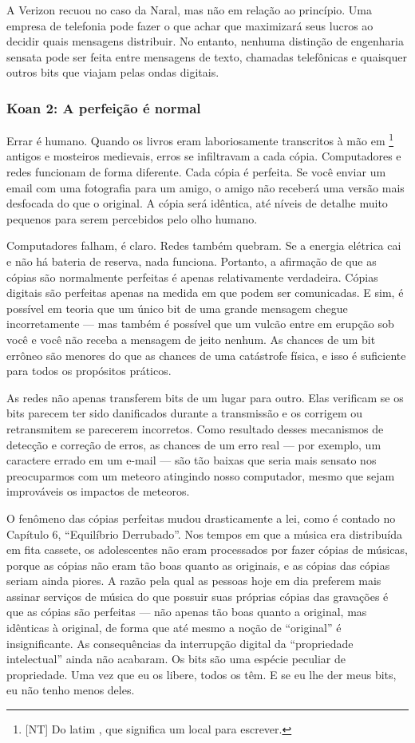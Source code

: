 A Verizon recuou no caso da Naral, mas não em relação ao princípio. Uma empresa 
de telefonia pode fazer o que achar que maximizará seus lucros ao decidir quais 
mensagens distribuir. No entanto, nenhuma distinção de engenharia sensata pode 
ser feita entre mensagens de texto, chamadas telefônicas e quaisquer outros bits
que viajam pelas ondas digitais.


\label{cap1:exp-dig-koans:2}
\subsubsection*{Koan 2: A perfeição é normal}
Errar é humano. Quando os livros eram laboriosamente transcritos à mão em 
\footnote{[NT] Do latim , que significa
um local para escrever.} antigos e mosteiros medievais, erros se infiltravam a
cada cópia. Computadores e redes funcionam de forma diferente. Cada cópia é
perfeita. Se você enviar um email com uma fotografia para um amigo, o amigo não
receberá uma versão mais desfocada do que o original. A cópia será idêntica, até
níveis de detalhe muito pequenos para serem percebidos pelo olho humano.

Computadores falham, é claro. Redes também quebram. Se a energia elétrica cai e
não há bateria de reserva, nada funciona. Portanto, a afirmação de que as cópias
são normalmente perfeitas é apenas relativamente verdadeira. Cópias digitais são
perfeitas apenas na medida em que podem ser comunicadas. E sim, é possível em
teoria que um único bit de uma grande mensagem chegue incorretamente --- mas
também é possível que um vulcão entre em erupção sob você e você não receba a
mensagem de jeito nenhum. As chances de um bit errôneo são menores do que as
chances de uma catástrofe física, e isso é suficiente para todos os propósitos
práticos.

As redes não apenas transferem bits de um lugar para outro. Elas verificam se os
bits parecem ter sido danificados durante a transmissão e os corrigem ou 
retransmitem se parecerem incorretos. Como resultado desses mecanismos de 
detecção e correção de erros, as chances de um erro real --- por exemplo, um
caractere errado em um e-mail --- são tão baixas que seria mais sensato nos
preocuparmos com um meteoro atingindo nosso computador, mesmo que sejam
improváveis os impactos de meteoros.

O fenômeno das cópias perfeitas mudou drasticamente a lei, como é contado no
Capítulo 6, ``Equilíbrio Derrubado''. Nos tempos em que a música era distribuída
em fita cassete, os adolescentes não eram processados por fazer cópias de 
músicas, porque as cópias não eram tão boas quanto as originais, e as cópias das
cópias seriam ainda piores. A razão pela qual as pessoas hoje em dia preferem
mais assinar serviços de música do que possuir suas próprias cópias das
gravações é que as cópias são perfeitas --- não apenas tão boas quanto a
original, mas idênticas à original, de forma que até mesmo a noção de
``original'' é insignificante. As consequências da interrupção digital da
``propriedade intelectual'' ainda não acabaram. Os bits são uma espécie peculiar
de propriedade. Uma vez que eu os libere, todos os têm. E se eu lhe der meus
bits, eu não tenho menos deles.


